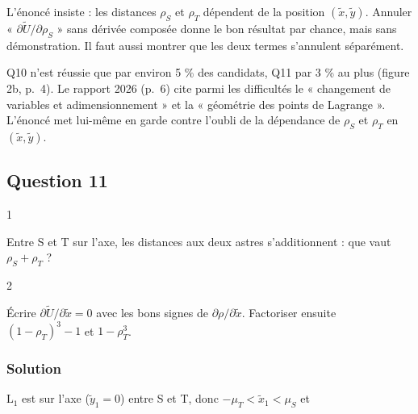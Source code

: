 \documentclass[11pt,a4paper]{article}
\newcommand{\equationajustee}[1]{%
  \sbox{\boiteequation}{$\displaystyle #1$}%
  \ifdim\wd\boiteequation>\linewidth
    \[\resizebox{\linewidth}{!}{\usebox{\boiteequation}}\]%
  \else
    \[#1\]%
  \fi}
\begin{document}
\begin{piege}

L'énoncé insiste : les distances \(\rho_S\) et \(\rho_T\) dépendent de la position \((\tilde x,\tilde y)\). Annuler « \(\partial\tilde U/\partial\rho_S\) » sans dérivée composée donne le bon résultat par chance, mais sans démonstration. Il faut aussi montrer que les deux termes s'annulent séparément.

\end{piege}

\begin{jury}

Q10 n'est réussie que par environ 5 \% des candidats, Q11 par 3 \% au plus (figure 2b, p.~4). Le rapport 2026 (p.~6) cite parmi les difficultés le « changement de variables et adimensionnement » et la « géométrie des points de Lagrange ». L'énoncé met lui-même en garde contre l'oubli de la dépendance de \(\rho_S\) et \(\rho_T\) en \((\tilde x,\tilde y)\).

\end{jury}

\hypertarget{question-11}{%
\subsection{Question 11}\label{question-11}}

\begin{indication}{1}

Entre S et T sur l'axe, les distances aux deux astres s'additionnent : que vaut \(\rho_S+\rho_T\) ?

\end{indication}

\begin{indication}{2}

Écrire \(\partial\tilde U/\partial\tilde x=0\) avec les bons signes de \(\partial\rho/\partial\tilde x\). Factoriser ensuite \((1-\rho_T)^3-1\) et \(1-\rho_T^3\).

\end{indication}

\hypertarget{solution-10}{%
\subsubsection{Solution}\label{solution-10}}

\(\mathrm L_1\) est sur l'axe (\(\tilde y_1=0\)) entre S et T, donc \(-\mu_T<\tilde x_1<\mu_S\) et

\equationajustee{\begin{aligned}
\rho_S&=\tilde x_1+\mu_T,\\
\rho_T&=\mu_S-\tilde x_1,
\end{aligned}}
\end{document}
